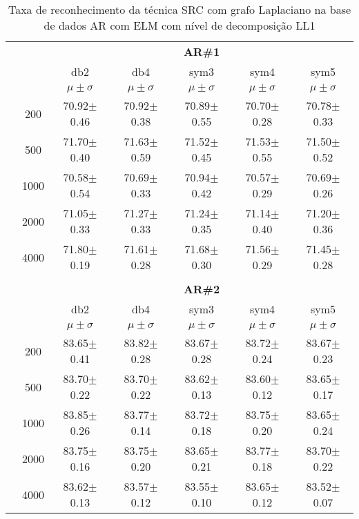 \begin{table}[H]
	\centering
    \normalsize
	\caption{Taxa de reconhecimento da técnica SRC com grafo Laplaciano na base de dados AR com ELM com nível de decomposição LL1}
     \hspace{0.5in}
		\begin{tabular}{|c|c|c c c c c|}
\cline{3-7}
\multicolumn{2}{c|}{\multirow{3}{*}{}} & \multicolumn{5}{c|}{\textbf{AR\#1}}   \\\cline{3-7} 
\multicolumn{2}{c|}{}  & db2 & db4 & sym3 & sym4 & sym5 \\\cline{3-7}%
\multicolumn{2}{c|}{}& $\mu \pm \sigma$ & $\mu \pm \sigma$ & $\mu \pm \sigma$ & $\mu \pm \sigma$ & $\mu \pm \sigma$ \\\hline


\multicolumn{1}{|c|}{ \multirow{5}{*}{\rotatebox[origin=c]{90}{\textbf{Neurônios}}} }
&200	&70.92$\pm$0.46	&70.92$\pm$0.38	&70.89$\pm$0.55	&70.70$\pm$0.28	&70.78$\pm$0.33	\\\cline{2-7}
&500	&71.70$\pm$0.40	&71.63$\pm$0.59	&71.52$\pm$0.45	&71.53$\pm$0.55	&71.50$\pm$0.52	\\\cline{2-7}
&1000	&70.58$\pm$0.54	&70.69$\pm$0.33	&70.94$\pm$0.42	&70.57$\pm$0.29	&70.69$\pm$0.26	\\\cline{2-7}
&2000	&71.05$\pm$0.33	&71.27$\pm$0.33	&71.24$\pm$0.35	&71.14$\pm$0.40	&71.20$\pm$0.36	\\\cline{2-7}
&4000	&71.80$\pm$0.19	&71.61$\pm$0.28	&71.68$\pm$0.30	&71.56$\pm$0.29	&71.45$\pm$0.28	

\\ \midrule
\multicolumn{7}{c}{}\\ 


\cline{3-7}
\multicolumn{2}{c|}{\multirow{3}{*}{}} & \multicolumn{5}{c|}{\textbf{AR\#2}}   \\\cline{3-7} 
\multicolumn{2}{c|}{}  & db2 & db4 & sym3 & sym4 & sym5 \\\cline{3-7}%
\multicolumn{2}{c|}{}& $\mu \pm \sigma$ & $\mu \pm \sigma$ & $\mu \pm \sigma$ & $\mu \pm \sigma$ & $\mu \pm \sigma$ \\\hline

\multicolumn{1}{|c|}{ \multirow{5}{*}{\rotatebox[origin=c]{90}{\textbf{Neurônios}}} }
&200	&83.65$\pm$0.41	&83.82$\pm$0.28	&83.67$\pm$0.28	&83.72$\pm$0.24 &83.67$\pm$0.23	\\\cline{2-7}
&500	&83.70$\pm$0.22	&83.70$\pm$0.22	&83.62$\pm$0.13	&83.60$\pm$0.12 &83.65$\pm$0.17\\\cline{2-7}
&1000	&83.85$\pm$0.26	&83.77$\pm$0.14	&83.72$\pm$0.18	&83.75$\pm$0.20	&83.65$\pm$0.24	\\\cline{2-7}
&2000	&83.75$\pm$0.16	&83.75$\pm$0.20	&83.65$\pm$0.21	&83.77$\pm$0.18	&83.70$\pm$0.22	\\\cline{2-7}
&4000	&83.62$\pm$0.13	&83.57$\pm$0.12	&83.55$\pm$0.10	&83.65$\pm$0.12	&83.52$\pm$0.07	



\end{tabular}
\end{table}
